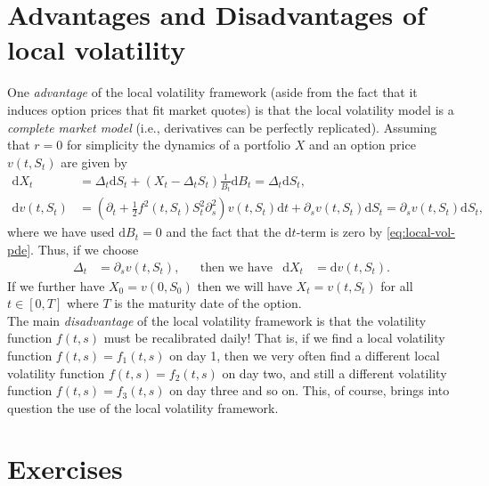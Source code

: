 \documentclass[12pt]{book}
\numberwithin{equation}{chapter}
\theoremstyle{plain}
\numberwithin{theorem}{section}
\theoremstyle{definition}
\numberwithin{exercise}{chapter}
\newcommand{\<}{\langle}
\renewcommand{\>}{\rangle}
\renewcommand{\(}{\left(}
\renewcommand{\)}{\right)}
\renewcommand{\[}{\left[}
\renewcommand{\]}{\right]}
\newcommand\Del{\Delta}
\renewcommand\d{\partial}
\newcommand\dd{\mathrm{d}}
\theoremstyle{definition}
\numberwithin{question}{section}
\begin{document}
\section{Advantages and Disadvantages of local volatility}
One \textit{advantage} of the local volatility framework (aside from the fact that it induces option prices that fit market quotes) is that the local volatility model is a \textit{complete market model} (i.e., derivatives can be perfectly replicated).  Assuming that $r=0$ for simplicity the dynamics of a portfolio $X$ and an option price $v(t,S_t)$ are given by
\begin{align}
\dd X_t 
	&= \Delta_t \dd S_t + (X_t - \Delta_t S_t) \frac{1}{B_t}  \dd B_t
	=	 \Delta_t \dd S_t , \\
\dd v(t,S_t) 
	&= \( \d_t + \frac{1}{2}f^2(t,S_t)  S_t^2  \d_s^2 \) v(t,S_t) \dd t  + \d_s v(t,S_t) \dd S_t 
	 =	\d_s v(t,S_t) \dd S_t ,
\end{align}
where we have used $\dd B_t = 0$ and the fact that the $\dd t$-term is zero by \eqref{eq:local-vol-pde}.
Thus, if we choose 
\begin{align}
\Del_t
	&=	\d_s v(t,S_t) , &
	&\text{then we have}&
\dd X_t
	&=	\dd v(t,S_t) .
\end{align}
If we further have $X_0 = v(0,S_0)$ then we will have $X_t = v(t,S_t)$ for all $t \in [0,T]$ where $T$ is the maturity date of the option.
\\[0.5em]
The main \textit{disadvantage} of the local volatility framework is that 
the volatility function $f(t,s)$ must be recalibrated daily! That is, if we find a local volatility function $f(t,s)=f_1(t,s)$ on day 1, then we very often find a different local volatility function $f(t,s) = f_2(t,s)$ on day two, and still a different volatility function $f(t,s) = f_3(t,s)$ on day three and so on.  This, of course, brings into question the use of the local volatility framework.


\section{Exercises}
\label{sec:exer-8}
\end{document}
